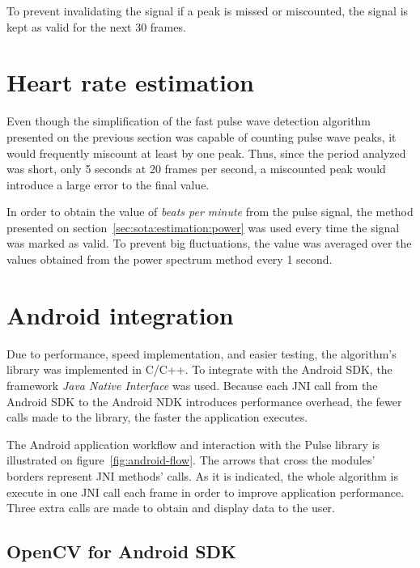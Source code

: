 To prevent invalidating the signal if a peak is missed or miscounted,
the signal is kept as valid for the next 30 frames.

\section{Heart rate estimation} \label{sec:impl:estimation}

Even though the simplification of the fast pulse wave detection algorithm
presented on the previous section was capable of counting pulse wave peaks,
it would frequently miscount at least by one peak. Thus, since the period
analyzed was short, only 5 seconds at 20 frames per second, a miscounted peak
would introduce a large error to the final value.

In order to obtain the value of \emph{beats per minute} from the pulse signal,
the method presented on section~\ref{sec:sota:estimation:power} was used
every time the signal was marked as valid.
To prevent big fluctuations, the value was averaged over the values obtained
from the power spectrum method every 1 second.

\section{Android integration} \label{sec:impl:android}


Due to performance, speed implementation, and easier testing, the algorithm's
library was implemented in C/C++. To integrate with the Android SDK, the
framework \emph{Java Native Interface} was used. Because each JNI call from the
Android SDK to the Android NDK introduces performance overhead,
the fewer calls made to the library, the faster the application executes.

The Android application workflow and interaction with the Pulse library is
illustrated on figure~\ref{fig:android-flow}. The arrows that cross the
modules' borders represent JNI methods' calls. As it is indicated, the whole
algorithm is execute in one JNI call each frame in order to improve
application performance. Three extra calls are made to obtain and display
data to the user.

\subsection{OpenCV for Android SDK} \label{sec:impl:android:opencv}

